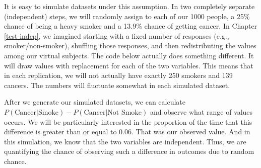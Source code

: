 \documentclass[
  openany]{book}
\begin{document}
It is easy to simulate datasets under this assumption. In two completely separate (independent) steps, we will randomly assign to each of our 1000 people, a 25\% chance of being a heavy smoker and a 13.9\% chance of getting cancer. In Chapter \ref{test-indep}, we imagined starting with a fixed number of responses (e.g., smoker/non-smoker), shuffling those responses, and then redistributing the values among our virtual subjects. The code below actually does something different. It will draw values with replacement for each of the two variables. This means that in each replication, we will not actually have exactly 250 smokers and 139 cancers. The numbers will fluctuate somewhat in each simulated dataset.

After we generate our simulated datasets, we can calculate \(P(\text{Cancer}|\text{Smoke})-P(\text{Cancer}|\text{Not Smoke})\) and observe what range of values occurs. We will be particularly interested in the proportion of the time that this difference is greater than or equal to \(0.06\). That was our observed value. And in this simulation, we know that the two variables are independent. Thus, we are quantifying the chance of observing such a difference in outcomes due to random chance.
\end{document}

